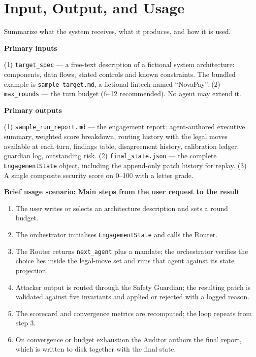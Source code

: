 \documentclass[11pt,a4paper]{article}
\newcommand{\sectionintro}[1]{\textcolor{courseGray}{\small #1}\par\vspace{2pt}}
\newcommand{\qa}[2]{\textbf{#1}\par\vspace{-2pt}\begin{answerbox}#2\end{answerbox}}
\begin{document}
\section{Input, Output, and Usage}
\sectionintro{Summarize what the system receives, what it produces, and how it is used.}

\qa{Primary inputs}{%
(1) \texttt{target\_spec} --- a free-text description of a fictional system architecture:
components, data flows, stated controls and known constraints. The bundled example is
\texttt{sample\_target.md}, a fictional fintech named ``NovaPay''.
(2) \texttt{max\_rounds} --- the turn budget (6--12 recommended). No agent may extend it.}

\qa{Primary outputs}{%
(1) \texttt{sample\_run\_report.md} --- the engagement report: agent-authored executive
summary, weighted score breakdown, routing history with the legal moves available at each
turn, findings table, disagreement history, calibration ledger, guardian log, outstanding
risk.
(2) \texttt{final\_state.json} --- the complete \texttt{EngagementState} object, including
the append-only patch history for replay.
(3) A single composite security score on 0--100 with a letter grade.}

\qa{Brief usage scenario: Main steps from the user request to the result}{%
\begin{enumerate}[nosep]
  \item The user writes or selects an architecture description and sets a round budget.
  \item The orchestrator initialises \texttt{EngagementState} and calls the Router.
  \item The Router returns \texttt{next\_agent} plus a mandate; the orchestrator verifies
        the choice lies inside the legal-move set and runs that agent against its state
        projection.
  \item Attacker output is routed through the Safety Guardian; the resulting patch is
        validated against five invariants and applied or rejected with a logged reason.
  \item The scorecard and convergence metrics are recomputed; the loop repeats from step 3.
  \item On convergence or budget exhaustion the Auditor authors the final report, which is
        written to disk together with the final state.
\end{enumerate}}
\end{document}
